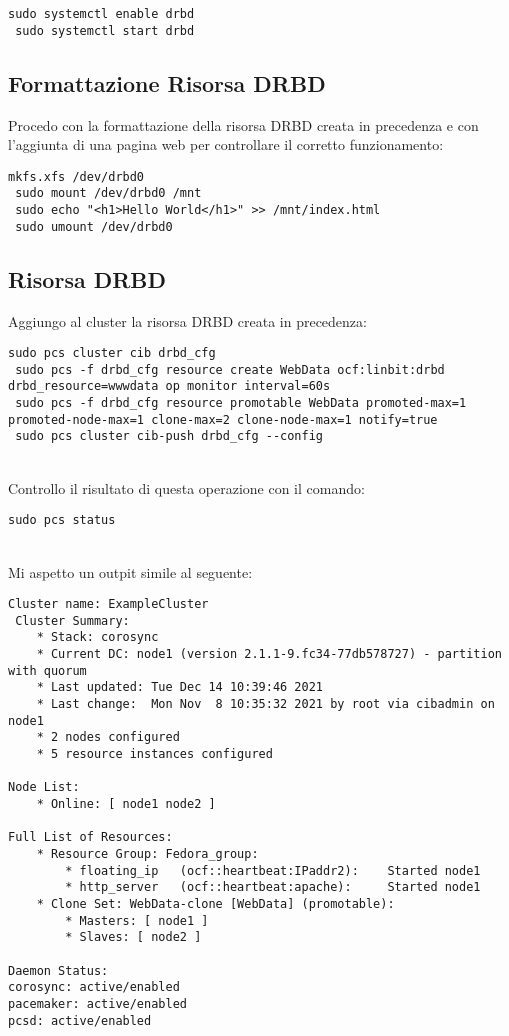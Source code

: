 \begin{lstlisting}[style=cmd]
 sudo systemctl enable drbd
 sudo systemctl start drbd
\end{lstlisting}

\subsection{Formattazione Risorsa DRBD}

Procedo con la formattazione della risorsa DRBD creata in precedenza e con l'aggiunta di una pagina web per controllare il corretto funzionamento:

\begin{lstlisting}[style=cmd]
 mkfs.xfs /dev/drbd0
 sudo mount /dev/drbd0 /mnt
 sudo echo "<h1>Hello World</h1>" >> /mnt/index.html
 sudo umount /dev/drbd0
\end{lstlisting}

\subsection{Risorsa DRBD}

Aggiungo al cluster la risorsa DRBD creata in precedenza:

\begin{lstlisting}[style=cmd]
 sudo pcs cluster cib drbd_cfg
 sudo pcs -f drbd_cfg resource create WebData ocf:linbit:drbd drbd_resource=wwwdata op monitor interval=60s
 sudo pcs -f drbd_cfg resource promotable WebData promoted-max=1 promoted-node-max=1 clone-max=2 clone-node-max=1 notify=true
 sudo pcs cluster cib-push drbd_cfg --config
\end{lstlisting}
\ \\
Controllo il risultato di questa operazione con il comando:

\begin{lstlisting}[style=cmd]
 sudo pcs status
\end{lstlisting}
\ \\
Mi aspetto un outpit simile al seguente:

\begin{lstlisting}[style=output]
 Cluster name: ExampleCluster
 Cluster Summary:
    * Stack: corosync
    * Current DC: node1 (version 2.1.1-9.fc34-77db578727) - partition with quorum
    * Last updated: Tue Dec 14 10:39:46 2021
    * Last change:  Mon Nov  8 10:35:32 2021 by root via cibadmin on node1
    * 2 nodes configured
    * 5 resource instances configured

Node List:
    * Online: [ node1 node2 ]

Full List of Resources:
    * Resource Group: Fedora_group:
        * floating_ip	(ocf::heartbeat:IPaddr2):	 Started node1
        * http_server	(ocf::heartbeat:apache):	 Started node1
    * Clone Set: WebData-clone [WebData] (promotable):
        * Masters: [ node1 ]
        * Slaves: [ node2 ]

Daemon Status:
corosync: active/enabled
pacemaker: active/enabled
pcsd: active/enabled

\end{lstlisting}

